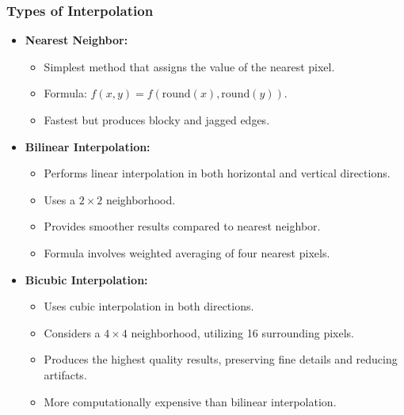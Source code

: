 \documentclass[12pt,a4paper]{article}
\begin{document}
\subsubsection{Types of Interpolation}
\begin{itemize}
  \item \textbf{Nearest Neighbor:}
    \begin{itemize}
      \item Simplest method that assigns the value of the nearest pixel.
      \item Formula: \( f(x,y) = f(\text{round}(x), \text{round}(y)) \).
      \item Fastest but produces blocky and jagged edges.
    \end{itemize}

  \item \textbf{Bilinear Interpolation:}
    \begin{itemize}
      \item Performs linear interpolation in both horizontal and vertical directions.
      \item Uses a \(2 \times 2\) neighborhood.
      \item Provides smoother results compared to nearest neighbor.
      \item Formula involves weighted averaging of four nearest pixels.
    \end{itemize}

  \item \textbf{Bicubic Interpolation:}
    \begin{itemize}
      \item Uses cubic interpolation in both directions.
      \item Considers a \(4 \times 4\) neighborhood, utilizing 16 surrounding pixels.
      \item Produces the highest quality results, preserving fine details and reducing artifacts.
      \item More computationally expensive than bilinear interpolation.
    \end{itemize}
\end{itemize}
\end{document}
